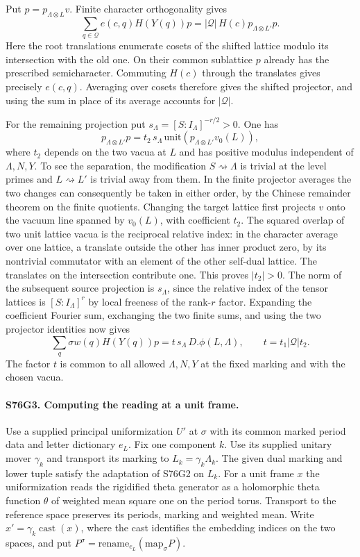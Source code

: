 Put $p=p_{\Lambda\otimes L}v$. Finite character orthogonality gives
\[
 \sum_{q\in\mathcal Q}e(c,q) H(Y(q))p
   =|\mathcal Q|\,H(c)p_{\Lambda\otimes L'}p .
\]
Here the root translations enumerate cosets of the shifted lattice
modulo its intersection with the old one. On their common
sublattice $p$ already has the prescribed semicharacter.
Commuting $H(c)$ through the translates gives precisely $e(c,q)$.
Averaging over cosets therefore gives the shifted projector, and
using the sum in place of its average accounts for $|\mathcal Q|$.

For the remaining projection put
$s_\Lambda=[S:I_\Lambda]^{-r/2}>0$. One has
\[
 p_{\Lambda\otimes L'}p
     =t_2\,s_\Lambda\,\mathrm{unit}
                      (p_{\Lambda\otimes L'}v_0(L)),
\]
where $t_2$ depends on the two vacua at $L$ and has positive
modulus independent of $\Lambda,N,Y$. To see the separation,
the modification $S\rightsquigarrow\Lambda$ is trivial at the
level primes and $L\rightsquigarrow L'$ is trivial away from them.
In the finite projector averages the two changes can consequently
be taken in either order, by the Chinese remainder theorem on the
finite quotients. Changing the target lattice first projects $v$
onto the vacuum line spanned by $v_0(L)$, with coefficient $t_2$.
The squared overlap of two unit lattice vacua is the reciprocal
relative index: in the character average over one lattice, a
translate outside the other has inner product zero, by its
nontrivial commutator with an element of the other self-dual
lattice. The translates on the intersection contribute one.
This proves $|t_2|>0$. The norm of the subsequent source projection
is $s_\Lambda$, since the relative index of the tensor lattices
is $[S:I_\Lambda]^r$ by local freeness of the rank-$r$ factor.
Expanding the coefficient Fourier sum, exchanging the two finite
sums, and using the two projector identities now gives
\[
 \sum_q \sigma w(q)H(Y(q))p
     =t\,s_\Lambda\,D.\phi(L,\Lambda),
       \qquad t=t_1|\mathcal Q|t_2 .
\]
The factor $t$ is common to all allowed $\Lambda,N,Y$ at the
fixed marking and with the chosen vacua.

\paragraph{S76G3. Computing the reading at a unit frame.}
Use a supplied principal uniformization $U'$ at $\sigma$ with its
common marked period data and letter dictionary $e_L$. Fix one
component $k$. Use its supplied unitary mover $\gamma_k$ and
transport its marking to $L_k=\gamma_k\Lambda_k$. The given dual
marking and lower tuple satisfy the adaptation of S76G2 on $L_k$.
For a unit frame $x$ the uniformization reads the rigidified
theta generator as a holomorphic theta function $\theta$ of
weighted mean square one on the period torus. Transport to the
reference space preserves its periods, marking and weighted mean.
Write $x'=\gamma_k\operatorname{cast}(x)$, where the cast identifies
the embedding indices on the two spaces, and put
$P^\sigma=\mathrm{rename}_{e_L}(\mathrm{map}_{\sigma}P)$.

